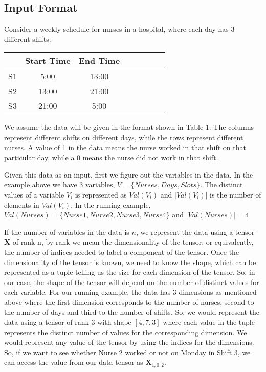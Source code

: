 \documentclass{article}
\begin{document}
\subsection{Input Format}
Consider a weekly schedule for nurses in a hospital, where each day has 3 different shifts:
\begin{center}
\begin{tabular}{c|c|c|c|c|c|c|l|}
\cline{2-3}
\multicolumn{1}{l|}{}        & Start Time & End Time \\ \hline
\multicolumn{1}{|c|}{S1} & 5:00  & 13:00   \\ 
\multicolumn{1}{|c|}{S2} & 13:00 & 21:00   \\ 
\multicolumn{1}{|c|}{S3} & 21:00 & 5:00   \\ \hline
\end{tabular}
\end{center}
We assume the data will be given in the format shown in Table 1. The columns represent different shifts on different days, while the rows represent different nurses. A value of 1 in the data means the nurse worked in that shift on that particular day, while a 0 means the nurse did not work in that shift. 

Given this data as an input, first we figure out the variables in the data. In the example above we have 3 variables, $V = \{Nurses, Days, Slots\}$. The distinct values of a variable $V_i$ is represented as $Val(V_i)$ and $|Val(V_i)|$ is the number of elements in $Val(V_i)$. In the running example, $Val(Nurses)=\{Nurse1, Nurse2, Nurse3, Nurse4\}$ and $|Val(Nurses)| = 4$

If the number of variables in the data is $n$, we represent the data using a tensor $\textbf{X}$ of rank n, by rank we mean the dimensionality of the tensor, or equivalently, the number of indices needed to label a component of the tensor. 
Once the dimensionality of the tensor is known, we need to know the shape, which can be represented as a tuple telling us the size for each dimension of the tensor. So, in our case, the shape of the tensor will depend on the number of distinct values for each variable. For our running example, the data has 3 dimensions as mentioned above where the first dimension corresponds to the number of nurses, second to the number of days and third to the number of shifts. So, we would represent the data using a tensor of rank $3$ with shape $[4, 7, 3]$ where each value in the tuple represents the distinct number of values for the corresponding dimension. We would represent any value of the tensor by using the indices for the dimensions. So, if we want to see whether Nurse 2 worked or not on Monday in Shift 3, we can access the value from our data tensor as $\textbf{X}_{1,0,2}$.
 
\end{document}
